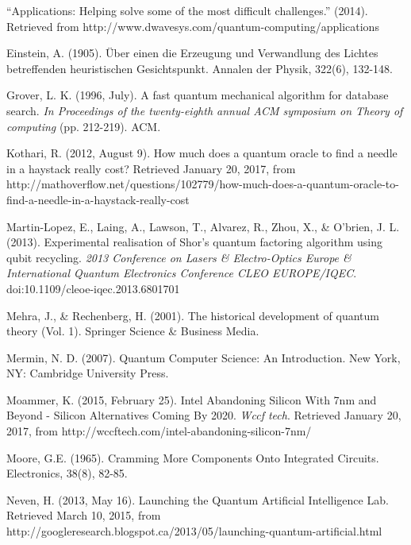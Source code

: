 \documentclass[11pt]{report}
\newcommand{\?}{\stackrel{?}{=}}
\begin{document}
\begin{thebibliography}{9}
  
  “Applications: Helping solve some of the most difficult challenges.” (2014). Retrieved from http://www.dwavesys.com/quantum-computing/applications
  
  Einstein, A. (1905). Über einen die Erzeugung und Verwandlung des Lichtes betreffenden heuristischen Gesichtspunkt. Annalen der Physik, 322(6), 132-148.

  Grover, L. K. (1996, July). A fast quantum mechanical algorithm for database search. \emph{In Proceedings of the twenty-eighth annual ACM symposium on Theory of computing} (pp. 212-219). ACM.

  Kothari, R. (2012, August 9). How much does a quantum oracle to find a needle in a haystack really cost? Retrieved January 20, 2017, from http://mathoverflow.net/questions/102779/how-much-does-a-quantum-oracle-to-find-a-needle-in-a-haystack-really-cost

  Martin-Lopez, E., Laing, A., Lawson, T., Alvarez, R., Zhou, X., \& O'brien, J. L. (2013). Experimental realisation of Shor's quantum factoring algorithm using qubit recycling. \emph{2013 Conference on Lasers \& Electro-Optics Europe \& International Quantum Electronics Conference CLEO EUROPE/IQEC}. doi:10.1109/cleoe-iqec.2013.6801701

  Mehra, J., \& Rechenberg, H. (2001). The historical development of quantum theory (Vol. 1). Springer Science \& Business Media.
  
  Mermin, N. D. (2007). Quantum Computer Science: An Introduction. New York, NY: Cambridge University Press.

  Moammer, K. (2015, February 25). Intel Abandoning Silicon With 7nm and Beyond - Silicon Alternatives Coming By 2020. \emph{Wccf tech}. Retrieved January 20, 2017, from http://wccftech.com/intel-abandoning-silicon-7nm/

  Moore, G.E. (1965). Cramming More Components Onto Integrated Circuits. Electronics, 38(8), 82-85.

  Neven, H. (2013, May 16). Launching the Quantum Artificial Intelligence Lab. Retrieved March 10, 2015, from http://googleresearch.blogspot.ca/2013/05/launching-quantum-artificial.html
  

\end{thebibliography}
\end{document}
